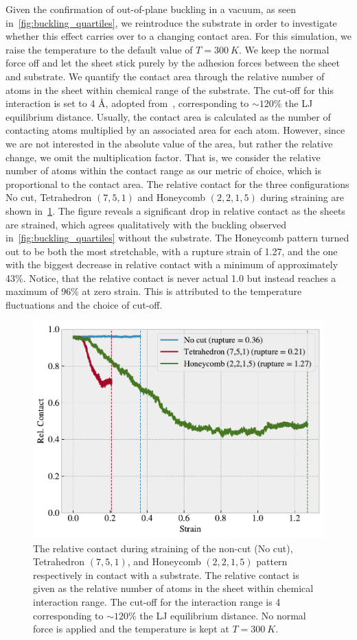 Given the confirmation of out-of-plane buckling in a vacuum, as seen
in~\cref{fig:buckling_quartiles}, we reintroduce the substrate in order to
investigate whether this effect carries over to a changing contact area. For
this simulation, we raise the temperature to the default value of $T
=\SI{300}{K}$. We keep the normal force off and let the sheet stick purely by
the adhesion forces between the sheet and substrate. We quantify the contact
area through the relative number of atoms in the sheet within chemical range of
the substrate. The cut-off for this interaction is set to 4 Å, adopted
from~\cite{li_evolving_2016}, corresponding to $\sim 120\%$ the \acrshort{LJ}
equilibrium distance. Usually, the contact area is calculated as the number of
contacting atoms multiplied by an associated area for each atom. However, since
we are not interested in the absolute value of the area, but rather the relative
change, we omit the multiplication factor. That is, we consider the relative
number of atoms within the contact range as our metric of choice, which is
proportional to the contact area. The relative contact for the three
configurations No cut, Tetrahedron $(7,5,1)$ and Honeycomb $(2,2,1,5)$ during
straining are shown in~\cref{fig:contact_vs_stretch}. The figure reveals
a significant drop in relative contact as the sheets are strained, which agrees
qualitatively with the buckling observed in~\cref{fig:buckling_quartiles}
without the substrate. The Honeycomb pattern turned out to be both the most
stretchable, with a rupture strain of 1.27, and the one with the biggest
decrease in relative contact with a minimum of approximately 43\%. Notice, that
the relative contact is never actual 1.0 but instead reaches a maximum of 96\%
at zero strain. This is attributed to the temperature fluctuations and the
choice of cut-off. 

\begin{figure}[!htb]
  \centering
  \includegraphics[width=0.5\linewidth]{figures/baseline/contact_vs_stretch.pdf}
  \caption{The relative contact during straining of the non-cut (No cut), Tetrahedron $(7,5,1)$, and Honeycomb $(2,2,1,5)$ pattern respectively in contact with a substrate. The relative contact is given as the relative number of atoms in the sheet within chemical interaction range. The cut-off for the interaction range is \SI{4}{} corresponding to $\sim 120 \%$ the \acrshort{LJ} equilibrium distance. No normal force is applied and the temperature is kept at $T = \SI{300}{K}$.}
  \label{fig:contact_vs_stretch}
\end{figure}

